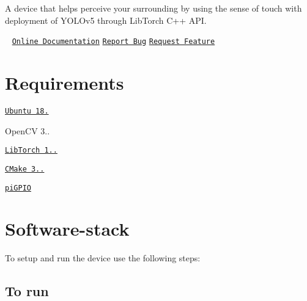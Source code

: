 A device that helps perceive your surrounding by using the sense of touch with deployment of Y\+O\+L\+Ov5 through Lib\+Torch C++ A\+PI.



   \href{https://github.com/Haptic-Vision/haptic_vision/blob/main/LICENSE}{\tt } ~\newline
 \href{http://htmlpreview.github.io/?https://github.com/Haptic-Vision/haptic_vision/blob/main/docs/html/index.html}{\tt Online Documentation} \href{https://github.com/MataPOS/matapos/issues}{\tt Report Bug} \href{https://github.com/MataPOS/matapos/issues}{\tt Request Feature} ~\newline


 

\section*{Requirements}


\begin{DoxyItemize}
\item \href{https://www.instructables.com/Install-Ubuntu-18044-LTS-on-Your-Raspberry-Pi-Boar/}{\tt Ubuntu 18.}
\item Open\+CV 3..
\item \href{https://download.pytorch.org/libtorch/nightly/cpu/libtorch-shared-with-deps-latest.zip}{\tt Lib\+Torch 1..}
\item \href{https://askubuntu.com/questions/355565/how-do-i-install-the-latest-version-of-cmake-from-the-command-line}{\tt C\+Make 3..}
\item \href{https://abyz.me.uk/rpi/pigpio/download.html}{\tt pi\+G\+P\+IO}
\end{DoxyItemize}

\section*{Software-\/stack}

To setup and run the device use the following steps\+:



\subsection*{To run}



